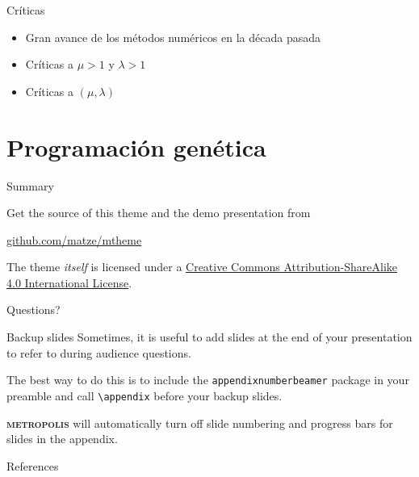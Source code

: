 \documentclass[10pt]{beamer}
\newcommand{\themename}{\textbf{\textsc{metropolis}}\xspace}
\begin{document}
\begin{frame}{Críticas}
  \begin{itemize}
  \item Gran avance de los métodos numéricos en la década pasada
  \item Críticas a $\mu > 1$ y $\lambda > 1$
  \item Críticas a $(\mu, \lambda)$
  \end{itemize}
\end{frame}

\section{Programación genética}

\begin{frame}{Summary}

  Get the source of this theme and the demo presentation from

  \begin{center}\url{github.com/matze/mtheme}\end{center}

  The theme \emph{itself} is licensed under a
  \href{http://creativecommons.org/licenses/by-sa/4.0/}{Creative Commons
  Attribution-ShareAlike 4.0 International License}.

  \begin{center}\ccbysa\end{center}

\end{frame}

\begin{frame}[standout]
  Questions?
\end{frame}

\appendix

\begin{frame}[fragile]{Backup slides}
  Sometimes, it is useful to add slides at the end of your presentation to
  refer to during audience questions.

  The best way to do this is to include the \verb|appendixnumberbeamer|
  package in your preamble and call \verb|\appendix| before your backup slides.

  \themename will automatically turn off slide numbering and progress bars for
  slides in the appendix.
\end{frame}

\begin{frame}[allowframebreaks]{References}

  
  

\end{frame}
\end{document}
